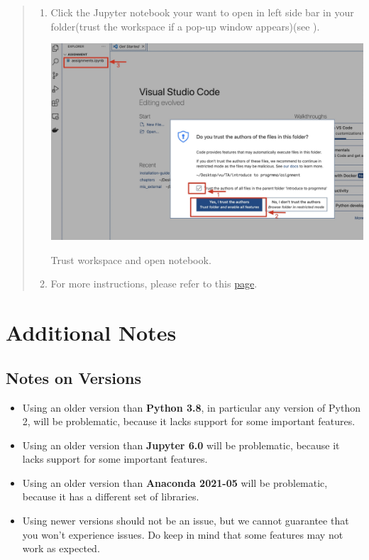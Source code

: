 \documentclass{latex-template/tufte-handout}
\begin{document}
\begin{quote}
\begin{enumerate}
\item Click the Jupyter notebook your want to open in left side bar in your folder(trust the workspace if a pop-up window appears)(see ). 
    \begin{marginfigure}%
      \includegraphics[width=1.3\linewidth]{assets/09-trust-workspace.jpg}
      \caption{Trust workspace and open notebook.}
      \label{fig:trust-workspace}
    \end{marginfigure}
\item For more instructions, please refer to this \href{https://code.visualstudio.com/docs/datascience/jupyter-notebooks}{page}.
\end{enumerate}
\end{quote}








\section{Additional Notes}
\label{additional-notes}



\subsection{Notes on Versions}\label{notes-on-versions}

\begin{itemize}
	\item Using an older version than \textbf{Python 3.8}, in particular any version of Python 2, will be problematic, because it lacks support for some important features.
	\item Using an older version than \textbf{Jupyter 6.0} will be problematic, because it lacks support for some important features.
	\item Using an older version than \textbf{Anaconda 2021-05} will be problematic, because it has a different set of libraries.
	\item Using newer versions should not be an issue, but we cannot guarantee that you won't experience issues. Do keep in mind that some features may not work as expected.
\end{itemize}
\end{document}
